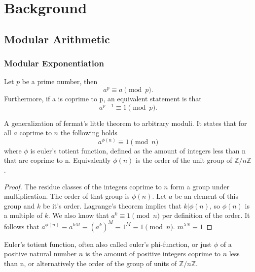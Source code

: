 

\chapter{Background}

\section{Modular Arithmetic}

\subsection{Modular Exponentiation}

\begin{theorem}
  Let $p$ be a prime number, then
  \[ a^{p} \equiv a \pmod{p}. \]
  Furthermore, if a is coprime to p, an equivalent statement is that
  \[ a^{p-1} \equiv 1 \pmod{p}. \]
\end{theorem}

\begin{theorem}
\label{thm:euler}
  A generalization of fermat's little theorem to arbitrary moduli. It states that for all $a$ coprime to $n$ the following holds
  \[ a^{\phi(n)} \equiv 1 \pmod{n} \]
  where $\phi$ is euler's totient function, defined as the amount of integers less than n that are coprime to n. Equivalently $\phi(n)$ is the order of the unit group of $\mathbb{Z}/n\mathbb{Z}$.
\end{theorem}

\begin{proof}
  The residue classes of the integers coprime to $n$ form a group under multiplication. The order of that group is $\phi(n)$. Let $a$ be an element of this group and $k$ be it's order. Lagrange's theorem implies that $k | \phi(n)$, so $\phi(n)$ is a multiple of $k$. We also know that $a^k \equiv 1 \pmod{n}$ per definition of the order. It follows that $a^{\phi(n)} \equiv a^{kM} \equiv (a^k)^M \equiv 1^M \equiv 1 \pmod{n}$. $m^{\lambda{N}} \equiv 1$
\end{proof}

\begin{definition}
  Euler's totient function, often also called euler's phi-function, or just $\phi$ of a positive natural number $n$ is the amount of positive integers coprime to $n$ less than n, or alternatively the order of the group of units of $\mathbb{Z}/n\mathbb{Z}$.
\end{definition}

